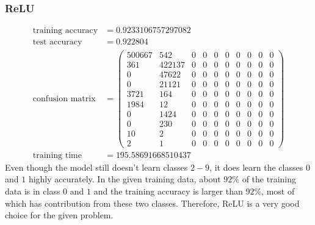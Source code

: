 \documentclass[11pt]{article}
\begin{document}
\subsubsection{ReLU}
\begin{equation}
  \begin{split}
    \text{training accuracy} &= 0.9233106757297082\\
    \text{test accuracy} &= 0.922804\\
    \text{confusion matrix} &=
    \begin{pmatrix}
      500667 & 542    & 0 & 0 & 0 & 0 & 0 & 0 & 0 & 0 \\
      361    & 422137 & 0 & 0 & 0 & 0 & 0 & 0 & 0 & 0 \\
      0      & 47622  & 0 & 0 & 0 & 0 & 0 & 0 & 0 & 0 \\
      0      & 21121  & 0 & 0 & 0 & 0 & 0 & 0 & 0 & 0 \\
      3721   & 164    & 0 & 0 & 0 & 0 & 0 & 0 & 0 & 0 \\
      1984   & 12     & 0 & 0 & 0 & 0 & 0 & 0 & 0 & 0 \\
      0      & 1424   & 0 & 0 & 0 & 0 & 0 & 0 & 0 & 0 \\
      0      & 230    & 0 & 0 & 0 & 0 & 0 & 0 & 0 & 0 \\
      10     & 2      & 0 & 0 & 0 & 0 & 0 & 0 & 0 & 0 \\
      2      & 1      & 0 & 0 & 0 & 0 & 0 & 0 & 0 & 0
    \end{pmatrix}\\
    \text{training time} &= 195.58691668510437
  \end{split}
\end{equation}
Even though the model still doesn't learn classes $2-9$, it does learn the classes $0$ and $1$ highly accurately. In the given training data, about $92\%$ of the training data is in class $0$ and $1$ and the training accuracy is larger than $92\%$, most of which has contribution from these two classes. Therefore, ReLU is a very good choice for the given problem.
\end{document}
